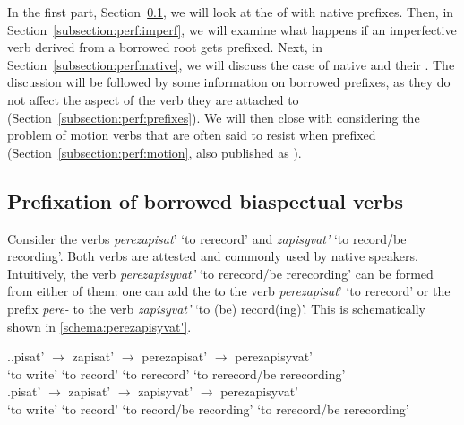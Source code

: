 In the first part, Section~\ref{subsection:perf:borrowed}, we will look at the  of  with native prefixes. Then, in Section~\ref{subsection:perf:imperf}, we will examine what happens if an imperfective verb derived from a borrowed root gets prefixed. Next, in Section~\ref{subsection:perf:native}, we will discuss the case of native  and their . The discussion will be followed by some information on borrowed prefixes, as they do not affect the aspect of the verb they are attached to (Section~\ref{subsection:perf:prefixes}). We will then close with considering the problem of motion verbs that are often said to resist  when prefixed (Section~\ref{subsection:perf:motion}, also published as \citealt{ZinovaOsswald:paper}).

\subsection{Prefixation of borrowed biaspectual verbs}\label{subsection:perf:borrowed}
Consider the verbs \textit{perezapisat}'\textsuperscript{\PF} `to rerecord' and \textit{zapisyvat'}\textsuperscript{\IPF} `to  record/be recording'. Both verbs are attested and commonly used by native speakers. Intuitively, the verb \textit{perezapisyvat'} `to rerecord/be rerecording' can be formed from either of them: one can add the  to the verb \textit{perezapisat}'\textsuperscript{\PF} `to rerecord' or the  prefix \textit{pere-} to the verb \textit{zapisyvat'}\textsuperscript{\IPF} `to (be) record(ing)'. This is schematically shown in \ref{schema:perezapisyvat'}.

\ex.\label{schema:perezapisyvat'}\ag.\label{schema:perezapisyvat'1}pisat'\textsuperscript{\IPF} {$\rightarrow$} zapisat'\textsuperscript{\PF} {$\rightarrow$} perezapisat'\textsuperscript{\PF} {$\rightarrow$} perezapisyvat'\textsuperscript{\IPF} \\
{`to write'} {} {`to record'} {} {`to rerecord'} {} {`to rerecord/be rerecording'}\\
\bg.\label{schema:perezapisyvat'2}pisat'\textsuperscript{\IPF} {$\rightarrow$} zapisat'\textsuperscript{\PF} {$\rightarrow$} zapisyvat'\textsuperscript{\IPF} {$\rightarrow$} perezapisyvat'\textsuperscript{\IPF} \\
{`to write'} {} {`to record'} {} {`to record/be recording'} {} {`to rerecord/be rerecording'}\\

